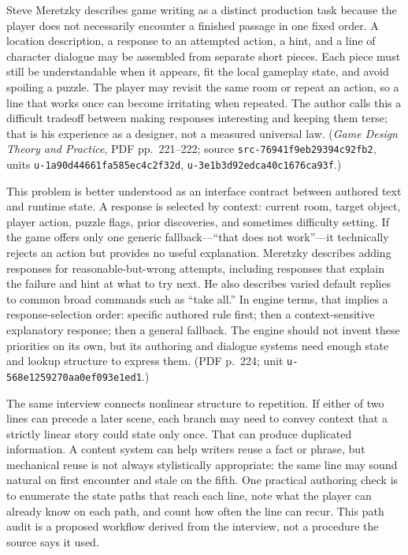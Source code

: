 Steve Meretzky describes game writing as a distinct production task because the player does not necessarily encounter a finished passage in one fixed order. A location description, a response to an attempted action, a hint, and a line of character dialogue may be assembled from separate short pieces. Each piece must still be understandable when it appears, fit the local gameplay state, and avoid spoiling a puzzle. The player may revisit the same room or repeat an action, so a line that works once can become irritating when repeated. The author calls this a difficult tradeoff between making responses interesting and keeping them terse; that is his experience as a designer, not a measured universal law. (\emph{Game Design Theory and Practice}, PDF pp.~221--222; source \texttt{src-76941f9eb29394c92fb2}, units \texttt{u-1a90d44661fa585ec4c2f32d}, \texttt{u-3e1b3d92edca40c1676ca93f}.)

This problem is better understood as an interface contract between authored text and runtime state. A response is selected by context: current room, target object, player action, puzzle flags, prior discoveries, and sometimes difficulty setting. If the game offers only one generic fallback---``that does not work''---it technically rejects an action but provides no useful explanation. Meretzky describes adding responses for reasonable-but-wrong attempts, including responses that explain the failure and hint at what to try next. He also describes varied default replies to common broad commands such as ``take all.'' In engine terms, that implies a response-selection order: specific authored rule first; then a context-sensitive explanatory response; then a general fallback. The engine should not invent these priorities on its own, but its authoring and dialogue systems need enough state and lookup structure to express them. (PDF p.~224; unit \texttt{u-568e1259270aa0ef093e1ed1}.)

The same interview connects nonlinear structure to repetition. If either of two lines can precede a later scene, each branch may need to convey context that a strictly linear story could state only once. That can produce duplicated information. A content system can help writers reuse a fact or phrase, but mechanical reuse is not always stylistically appropriate: the same line may sound natural on first encounter and stale on the fifth. One practical authoring check is to enumerate the state paths that reach each line, note what the player can already know on each path, and count how often the line can recur. This path audit is a proposed workflow derived from the interview, not a procedure the source says it used.

